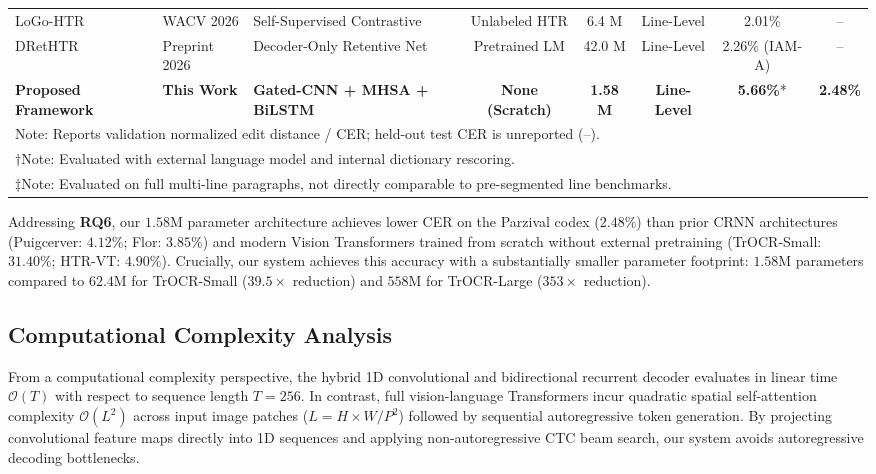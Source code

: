\documentclass{IEEEtran}
\begin{document}
\begin{table}[!t]
{\begin{tabular}{lllccccc}
LoGo-HTR~\cite{mitra2026logo}                    & WACV 2026   & Self-Supervised Contrastive & Unlabeled HTR & 6.4 M  & Line-Level & 2.01\% & -- \\
DRetHTR~\cite{kim2026drethtr}                    & Preprint 2026 & Decoder-Only Retentive Net & Pretrained LM & 42.0 M & Line-Level & 2.26\% (IAM-A) & -- \\
\midrule
\textbf{Proposed Framework}                      & \textbf{This Work} & \textbf{Gated-CNN + MHSA + BiLSTM} & \textbf{None (Scratch)} & \textbf{1.58 M} & \textbf{Line-Level} & \textbf{5.66\%}* & \textbf{2.48\%} \\
\bottomrule
\multicolumn{8}{l}{\footnotesize *Note: Reports validation normalized edit distance / CER; held-out test CER is unreported (--).} \\
\multicolumn{8}{l}{\footnotesize $\dagger$Note: Evaluated with external language model and internal dictionary rescoring.} \\
\multicolumn{8}{l}{\footnotesize $\ddagger$Note: Evaluated on full multi-line paragraphs, not directly comparable to pre-segmented line benchmarks.}
\end{tabular}%
}
\end{table}

Addressing \textbf{RQ6}, our $1.58\text{M}$ parameter architecture achieves lower CER on the Parzival codex ($2.48\%$) than prior CRNN architectures (Puigcerver: $4.12\%$; Flor: $3.85\%$) and modern Vision Transformers trained from scratch without external pretraining (TrOCR-Small: $31.40\%$; HTR-VT: $4.90\%$). Crucially, our system achieves this accuracy with a substantially smaller parameter footprint: $1.58\text{M}$ parameters compared to $62.4\text{M}$ for TrOCR-Small ($39.5\times$ reduction) and $558\text{M}$ for TrOCR-Large ($353\times$ reduction).

\subsection{Computational Complexity Analysis}

From a computational complexity perspective, the hybrid 1D convolutional and bidirectional recurrent decoder evaluates in linear time $\mathcal{O}(T)$ with respect to sequence length $T=256$. In contrast, full vision-language Transformers incur quadratic spatial self-attention complexity $\mathcal{O}(L^2)$ across input image patches ($L = H \times W / P^2$) followed by sequential autoregressive token generation. By projecting convolutional feature maps directly into 1D sequences and applying non-autoregressive CTC beam search, our system avoids autoregressive decoding bottlenecks.
\end{document}
